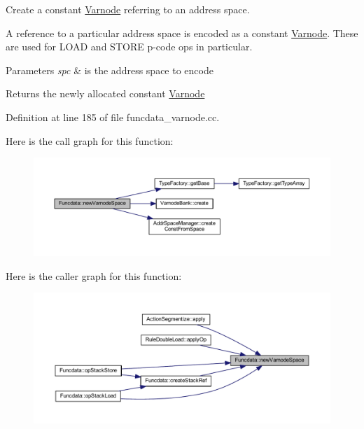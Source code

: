 Create a constant \mbox{\hyperlink{class_varnode}{Varnode}} referring to an address space. 

A reference to a particular address space is encoded as a constant \mbox{\hyperlink{class_varnode}{Varnode}}. These are used for L\+O\+AD and S\+T\+O\+RE p-\/code ops in particular. 
\begin{DoxyParams}{Parameters}
{\em spc} & is the address space to encode \\
\hline
\end{DoxyParams}
\begin{DoxyReturn}{Returns}
the newly allocated constant \mbox{\hyperlink{class_varnode}{Varnode}} 
\end{DoxyReturn}


Definition at line 185 of file funcdata\+\_\+varnode.\+cc.

Here is the call graph for this function\+:
\nopagebreak
\begin{figure}[H]
\begin{center}
\leavevmode
\includegraphics[width=350pt]{class_funcdata_acc9f6fb3e8a36e0e1e633660fc05fdbf_cgraph}
\end{center}
\end{figure}
Here is the caller graph for this function\+:
\nopagebreak
\begin{figure}[H]
\begin{center}
\leavevmode
\includegraphics[width=350pt]{class_funcdata_acc9f6fb3e8a36e0e1e633660fc05fdbf_icgraph}
\end{center}
\end{figure}
\mbox{\label{class_funcdata_ad810c24ce5fb16a95de1f7d27c8856d8}} 
